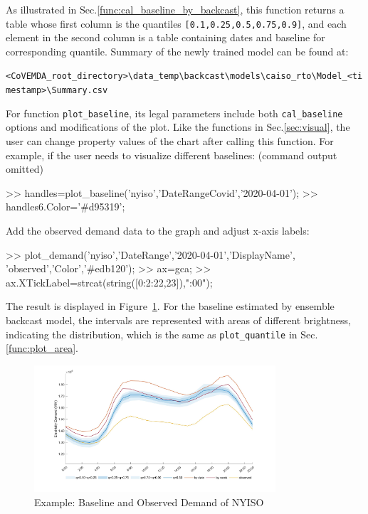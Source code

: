 \documentclass[10pt]{article}
\numberwithin{equation}{section}
\numberwithin{table}{section}
\numberwithin{figure}{section}
\begin{document}
As illustrated in Sec.\ref{func:cal_baseline_by_backcast}, this function returns a table whose first column is the quantiles \verb![0.1,0.25,0.5,0.75,0.9]!, and each element in the second column is a table containing dates and baseline for corresponding quantile. Summary of the newly trained model can be found at:
\begin{center}
    \verb!<CoVEMDA_root_directory>\data_temp\backcast\models\caiso_rto\Model_<timestamp>\Summary.csv!
\end{center}

For function \verb!plot_baseline!, its legal parameters include both \verb!cal_baseline! options and modifications of the plot. Like the functions in Sec.\ref{sec:visual}, the user can change property values of the chart after calling this function. For example, if the user needs to visualize different baselines: (command output omitted)

\begin{Code}
>> handles=plot_baseline('nyiso','DateRangeCovid','2020-04-01');
>> handles{6}.Color='#d95319';
\end{Code}

Add the observed demand data to the graph and adjust x-axis labels:

\begin{Code}
>> plot_demand('nyiso','DateRange','2020-04-01','DisplayName',
   'observed','Color','#edb120');
>> ax=gca;
>> ax.XTickLabel=strcat(string([0:2:22,23]),":00");
\end{Code}

The result is displayed in Figure~\ref{fig:baseline_eg1}. For the baseline estimated by ensemble backcast model, the intervals are represented with areas of different brightness, indicating the distribution, which is the same as \verb!plot_quantile! in Sec.\ref{func:plot_area}.

\begin{figure}
  \centering
  \noindent\includegraphics[width=0.8\textwidth]{figures/baseline_example1.jpg}
  \caption{Example: Baseline and Observed Demand of NYISO} \label{fig:baseline_eg1}
\end{figure}
\end{document}
